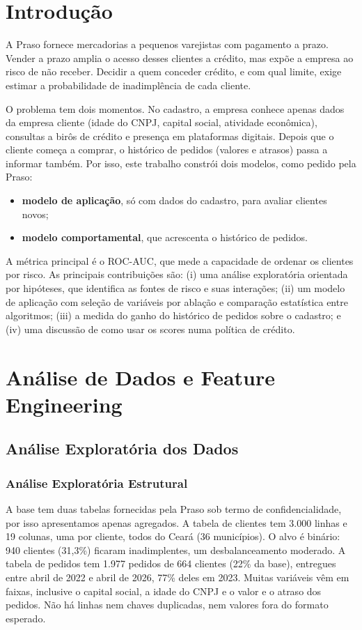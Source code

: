 \documentclass[conference]{IEEEtran}
\begin{document}
\section{Introdução}

A Praso fornece mercadorias a pequenos varejistas com pagamento a prazo. Vender a prazo amplia o acesso desses clientes a crédito, mas expõe a empresa ao risco de não receber. Decidir a quem conceder crédito, e com qual limite, exige estimar a probabilidade de inadimplência de cada cliente.

O problema tem dois momentos. No cadastro, a empresa conhece apenas dados da empresa cliente (idade do CNPJ, capital social, atividade econômica), consultas a birôs de crédito e presença em plataformas digitais. Depois que o cliente começa a comprar, o histórico de pedidos (valores e atrasos) passa a informar também. Por isso, este trabalho constrói dois modelos, como pedido pela Praso:
\begin{itemize}
\item \textbf{modelo de aplicação}, só com dados do cadastro, para avaliar clientes novos;
\item \textbf{modelo comportamental}, que acrescenta o histórico de pedidos.
\end{itemize}

A métrica principal é o ROC-AUC, que mede a capacidade de ordenar os clientes por risco. As principais contribuições são: (i) uma análise exploratória orientada por hipóteses, que identifica as fontes de risco e suas interações; (ii) um modelo de aplicação com seleção de variáveis por ablação e comparação estatística entre algoritmos; (iii) a medida do ganho do histórico de pedidos sobre o cadastro; e (iv) uma discussão de como usar os scores numa política de crédito.

\section{Análise de Dados e Feature Engineering}

\subsection{Análise Exploratória dos Dados}

\subsubsection{Análise Exploratória Estrutural}
A base tem duas tabelas fornecidas pela Praso sob termo de confidencialidade, por isso apresentamos apenas agregados. A tabela de clientes tem 3.000 linhas e 19 colunas, uma por cliente, todos do Ceará (36 municípios). O alvo é binário: 940 clientes (31,3\%) ficaram inadimplentes, um desbalanceamento moderado. A tabela de pedidos tem 1.977 pedidos de 664 clientes (22\% da base), entregues entre abril de 2022 e abril de 2026, 77\% deles em 2023. Muitas variáveis vêm em faixas, inclusive o capital social, a idade do CNPJ e o valor e o atraso dos pedidos. Não há linhas nem chaves duplicadas, nem valores fora do formato esperado.
\end{document}
